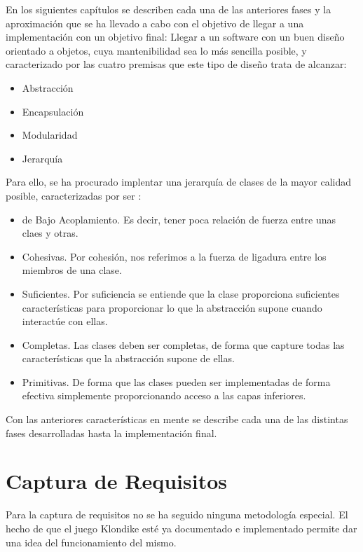 \documentclass[11pt]{article}
\begin{document}
En los siguientes capítulos se describen cada una de las anteriores fases y la aproximación que se ha llevado a cabo con el objetivo de llegar a una implementación con un objetivo final: Llegar a un software con un buen diseño orientado a objetos, cuya mantenibilidad sea lo más sencilla posible, y caracterizado por las cuatro premisas que este tipo de diseño trata de alcanzar:

\begin{itemize}\itemsep0pt
\item{Abstracción}
\item{Encapsulación}
\item{Modularidad}
\item{Jerarquía}
\end{itemize}

Para ello, se ha procurado implentar una jerarquía de clases de la mayor calidad posible, caracterizadas por ser :
\begin{itemize}\itemsep0pt
\item{de Bajo Acoplamiento}. Es decir, tener poca relación de fuerza entre unas claes y otras.
\item{Cohesivas}. Por cohesión, nos referimos a la fuerza de ligadura entre los miembros de una clase.
\item{Suficientes}. Por suficiencia se entiende que la clase proporciona suficientes características para proporcionar lo que la abstracción supone cuando interactúe con ellas.
\item{Completas}. Las clases deben ser completas, de forma que capture todas las características que la abstracción supone de ellas.
\item{Primitivas}. De forma que las clases pueden ser implementadas de forma efectiva simplemente proporcionando acceso a las capas inferiores.
\end{itemize}

Con las anteriores características en mente se describe cada una de las distintas fases desarrolladas hasta la implementación final.

\pagebreak

\section{Captura de Requisitos}

Para la captura de requisitos no se ha seguido ninguna metodología especial. El hecho de que el juego Klondike esté ya documentado e implementado permite dar una idea del funcionamiento del mismo.
\end{document}
